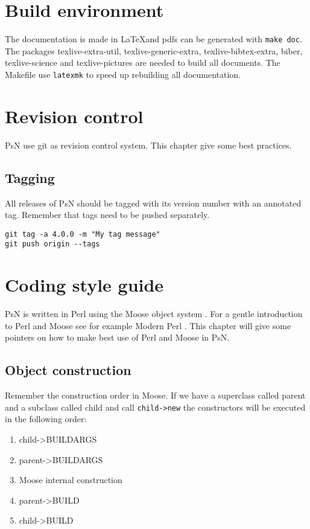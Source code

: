 \section{Build environment}
The documentation is made in \LaTeX and pdfs can be generated with \verb|make doc|. The
packages texlive-extra-util, texlive-generic-extra, texlive-bibtex-extra, biber, texlive-science and texlive-pictures are needed to build all documents.
The Makefile use \verb|latexmk| to speed up rebuilding all documentation.

\section{Revision control}
PsN use git as revision control system. This chapter give some best practices.

\subsection{Tagging}
All releases of PsN should be tagged with its version number with an annotated tag. Remember
that tags need to be pushed separately.
\begin{verbatim}
git tag -a 4.0.0 -m "My tag message"
git push origin --tags
\end{verbatim}

\section{Coding style guide}
PsN is written in Perl using the Moose object system \cite{Moose}. For a gentle introduction to Perl and Moose see for example Modern Perl \cite{modern}. This chapter will give some pointers on how to make best use of Perl and Moose in PsN. 

\subsection{Object construction}

Remember the construction order in Moose. If we have a superclass called parent and a subclass called child and call \verb|child->new| the constructors will be executed in the following order:

\begin{enumerate}
	\item child->BUILDARGS
	\item parent->BUILDARGS
	\item Moose internal construction
	\item parent->BUILD
	\item child->BUILD
\end{enumerate}


